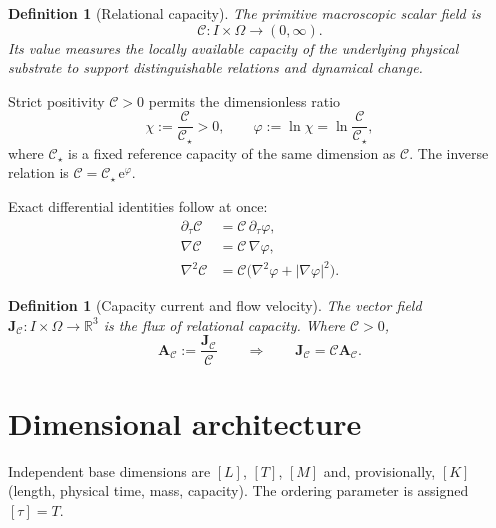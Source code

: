 \documentclass[11pt,a4paper]{article}
\newtheorem{definition}[axiom]{Definition}
\newcommand{\C}{\mathcal{C}}
\newcommand{\Cs}{\mathcal{C}_\star}
\newcommand{\Jc}{\mathbf{J}_{\mathcal{C}}}
\newcommand{\Ac}{\mathbf{A}_{\mathcal{C}}}
\newcommand{\e}{\mathrm{e}}
\begin{document}
\begin{definition}[Relational capacity]
The primitive macroscopic scalar field is
\[
\C:I\times\Omega\to(0,\infty).
\]
Its value measures the locally available capacity of the underlying physical substrate to support distinguishable relations and dynamical change.
\end{definition}

Strict positivity \(\C>0\) permits the dimensionless ratio
\[
\chi:=\frac{\C}{\Cs}>0,\qquad\varphi:=\ln\chi=\ln\frac{\C}{\Cs},
\]
where \(\Cs\) is a fixed reference capacity of the same dimension as \(\C\). The inverse relation is \(\C=\Cs\,\e^\varphi\).

Exact differential identities follow at once:
\begin{align}
\partial_\tau\C&=\C\,\partial_\tau\varphi,\\
\nabla\C&=\C\,\nabla\varphi,\\
\nabla^2\C&=\C\bigl(\nabla^2\varphi+|\nabla\varphi|^2\bigr).
\end{align}

\begin{definition}[Capacity current and flow velocity]
The vector field \(\Jc:I\times\Omega\to\mathbb{R}^3\) is the flux of relational capacity. Where \(\C>0\),
\[
\Ac:=\frac{\Jc}{\C}\qquad\Rightarrow\qquad\Jc=\C\Ac.
\]
\end{definition}

\section{Dimensional architecture}

Independent base dimensions are \([L]\), \([T]\), \([M]\) and, provisionally, \([K]\) (length, physical time, mass, capacity). The ordering parameter is assigned \([\tau]=T\).
\end{document}
